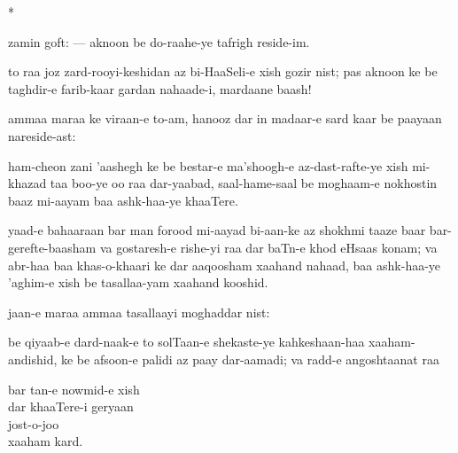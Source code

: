 \documentclass{article}
\renewcommand{\*}{%
	\begin{center}*\end{center}
}
\begin{document}
\*

zamin goft: --- aknoon be do-raahe-ye tafrigh reside-im.

to raa joz zard-rooyi-keshidan az bi-HaaSeli-e xish gozir nist; pas
aknoon ke be taghdir-e farib-kaar gardan nahaade-i, mardaane baash!

ammaa maraa ke viraan-e to-am, hanooz dar in madaar-e sard kaar be
paayaan nareside-ast:

ham-cheon zani 'aashegh ke be bestar-e ma'shoogh-e az-dast-rafte-ye
xish mi-khazad taa boo-ye oo raa dar-yaabad, saal-hame-saal be
moghaam-e nokhostin baaz mi-aayam baa ashk-haa-ye khaaTere.

yaad-e bahaaraan bar man forood mi-aayad bi-aan-ke az shokhmi taaze
baar bar-gerefte-baasham va gostaresh-e rishe-yi raa dar baTn-e khod
eHsaas konam; va abr-haa baa khas-o-khaari ke dar aaqoosham
xaahand nahaad, baa ashk-haa-ye 'aghim-e xish be tasallaa-yam
xaahand kooshid.

jaan-e maraa ammaa tasallaayi moghaddar nist:

be qiyaab-e dard-naak-e to solTaan-e shekaste-ye kahkeshaan-haa
xaaham-andishid, ke be afsoon-e palidi az paay dar-aamadi;
va radd-e angoshtaanat raa
\vspace{-.8\baselineskip}
\begin{tabbing}
bar tan-e nowmid-e xish\=\\
			\>dar khaaTere-i geryaan\\
			\>jost-o-joo\\
			\>xaaham kard.\\
\end{tabbing}
\end{document}

